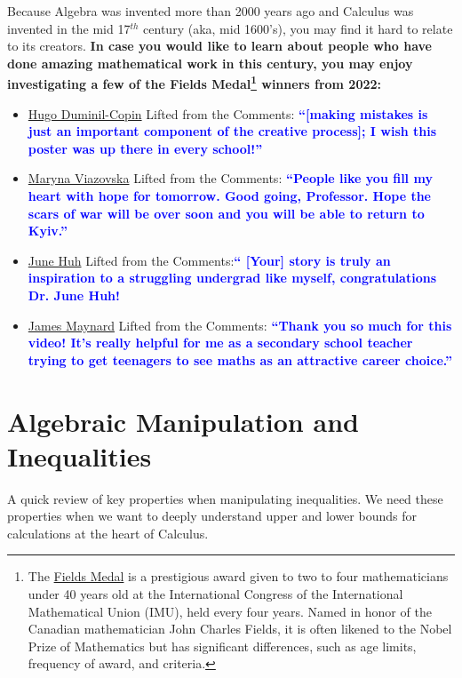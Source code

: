 Because Algebra was invented more than 2000 years ago and Calculus was invented in the mid 17$^{th}$ century (aka, mid 1600's), you may find it hard to relate to its creators. \textbf{In case you would like to learn about people who have done amazing mathematical work in this century, you may enjoy investigating a few of the Fields Medal\footnote{The \href{https://g.co/kgs/dSdLhd}{Fields Medal} is a prestigious award given to two to four mathematicians under 40 years old at the International Congress of the International Mathematical Union (IMU), held every four years. Named in honor of the Canadian mathematician John Charles Fields, it is often likened to the Nobel Prize of Mathematics but has significant differences, such as age limits, frequency of award, and criteria.} winners from 2022:}
 \begin{itemize}
    \item \href{https://youtu.be/5dXulZVstbY}{Hugo Duminil-Copin} Lifted from the Comments: \textcolor{blue}{\bf ``[making mistakes is just an important component of the creative process]; I wish this poster was up there in every school!''}
     \item \href{https://www.youtube.com/watch?v=TlCJYxmnInQ}{Maryna Viazovska} Lifted from the Comments: \textcolor{blue}{\bf ``People like you fill my heart with hope for tomorrow. Good going, Professor. Hope the scars of war will be over soon and you will be able to return to Kyiv.''}
     \item \href{https://youtu.be/yO8lQWb6TZ4}{June Huh} Lifted from the Comments:\textcolor{blue}{\bf  `` [Your] story is truly an inspiration to a struggling undergrad like myself, congratulations Dr. June Huh!}
     \item \href{https://youtu.be/un-z8kgOrV0}{James Maynard} Lifted from the Comments: \textcolor{blue}{\bf ``Thank you so much for this video! It's really helpful for me as a secondary school teacher trying to get teenagers to see maths as an attractive career choice.''}
 \end{itemize}


\section{Algebraic Manipulation and Inequalities} 

A quick review of key properties when manipulating inequalities. We need these properties when we want to deeply understand upper and lower bounds for calculations at the heart of Calculus.

